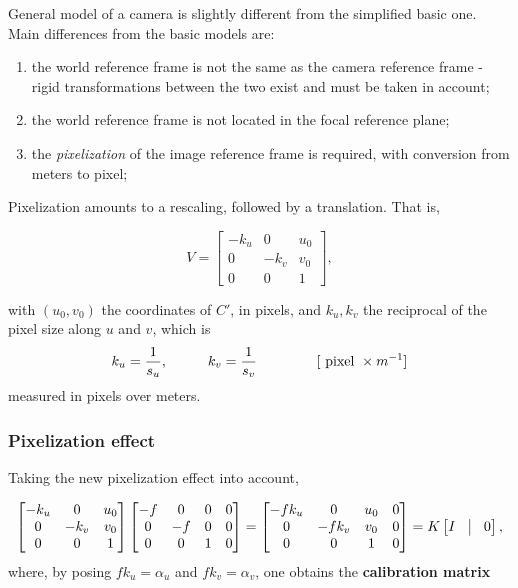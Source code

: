 \documentclass[10pt]{report}
\begin{document}
General model of a camera is slightly
different from the simplified basic one. Main differences from the basic
models are:

\begin{enumerate}
\item the world reference frame is not the same as the camera reference
frame - rigid transformations between the two exist and must be taken
in account;
\item the world reference frame is not located in the focal reference
plane;
\item the \emph{pixelization} of the image reference frame is required, with
conversion from meters to pixel;
\end{enumerate}

Pixelization amounts to a rescaling, followed by a translation. That is,

\[V = \begin{bmatrix} -k_u & 0 & u_0 \\ 0 & -k_v & v_0 \\ 0 & 0 & 1 \end{bmatrix},\]

with \((u_0, v_0)\) the coordinates of \(C'\), in pixels, and
\(k_u, k_v\) the reciprocal of the pixel size along \(u\) and \(v\),
which is \[k_u = \frac{1}{s_u},\hspace*{1cm} k_v = \frac{1}{s_v} \hspace*{1.5cm}[\mbox{ pixel } \times m^{-1}]\] measured in
pixels over meters.

\subsubsection{Pixelization effect}
\label{sec:org8d7642a}
Taking the new pixelization effect into account,

\[ \begin{bmatrix} -k_u & 0 & u_0 \\ 0 & -k_v & v_0 \\ 0 & 0 & 1 \end{bmatrix}\begin{bmatrix} -f & 0 & 0 & 0 \\ 0 & -f & 0 & 0 \\ 0 & 0 & 1 & 0 \end{bmatrix} = \begin{bmatrix} -fk_u & 0 & u_0 & 0 \\ 0 & -fk_v & v_0 & 0 \\ 0 & 0 & 1 & 0 \end{bmatrix} = K\begin{bmatrix} I & \vline & 0\end{bmatrix},\]
where, by posing \(fk_u = \alpha_u\) and \(fk_v = \alpha_v\), one
obtains the \textbf{calibration matrix}
\end{document}
